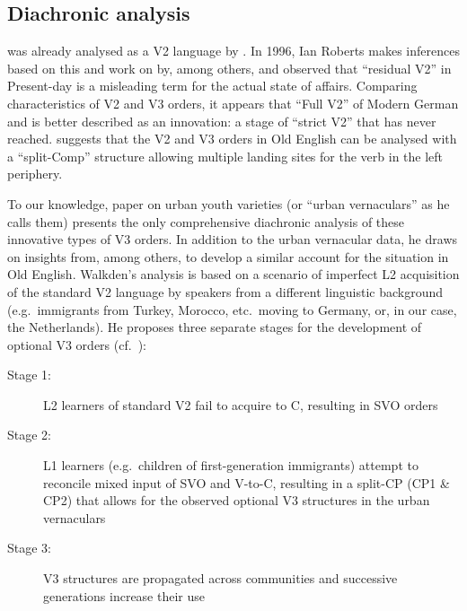\documentclass[output=paper]{langsci/langscibook}
\begin{document}
\subsection{Diachronic analysis}
\label{sec:ana2}

 was already analysed as a V2 language by
\citet{VanKemenade:1987}.  In 1996, Ian Roberts makes inferences based on this
and work on  by, among others, \citet{Kiparsky:1994} and observed
that ``residual V2'' in Present-day  is a misleading term for the
actual state of affairs.  Comparing characteristics of 
V2 and V3 orders, it appears that ``Full
V2'' of Modern German and  is better described as an innovation: a
stage of \enquote{strict V2} that  has never reached.
\textcite{Roberts1996} suggests that the V2 and V3 orders in Old English can be analysed with a ``split-Comp'' structure
allowing multiple landing sites for the verb in the left periphery.

To our knowledge,  paper on  urban youth
varieties (or \enquote{urban vernaculars} as he calls them) presents the only
comprehensive diachronic analysis of these innovative types of V3 orders. In addition to the urban vernacular data, he draws on insights
from, among others, \textcite{Roberts1996} to develop a similar account for the
situation in Old English. Walkden's analysis is based on a scenario of
imperfect L2 acquisition of the standard V2 language by speakers from a different linguistic background (e.g.\
immigrants from Turkey, Morocco, etc.\ moving to Germany, or, in our case, the
Netherlands). He proposes three separate stages for the development of optional
V3\is{V3 word order} orders (cf.\ \citealt{Walkden:2017}):\largerpage

\begin{description}
    \item[Stage 1:] L2 learners of standard  V2 fail to acquire
        \isi{verb movement} to C, resulting in SVO orders

    \item[Stage 2:] L1 learners (e.g.\ children of first-generation
        immigrants) attempt to reconcile mixed input of SVO and V-to-C,
        resulting in a split-CP (CP1 \& CP2) that allows for the observed
        optional V3\is{V3 word order} structures in the urban vernaculars

    \item[Stage 3:] V3 structures are propagated across communities and
        successive generations increase their use
\end{description}
\end{document}
